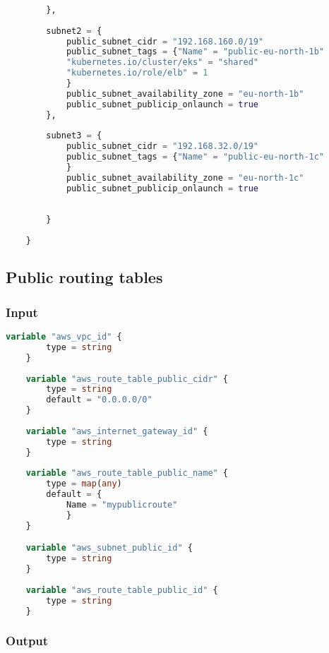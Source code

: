 \begin{lstlisting}[language=terraform]
            
        },
    
        subnet2 = {
            public_subnet_cidr = "192.168.160.0/19"
            public_subnet_tags = {"Name" = "public-eu-north-1b"
            "kubernetes.io/cluster/eks" = "shared"
            "kubernetes.io/role/elb" = 1
            }
            public_subnet_availability_zone = "eu-north-1b"
            public_subnet_publicip_onlaunch = true
        },
    
        subnet3 = {
            public_subnet_cidr = "192.168.32.0/19"
            public_subnet_tags = {"Name" = "public-eu-north-1c"
            }
            public_subnet_availability_zone = "eu-north-1c"
            public_subnet_publicip_onlaunch = true
    
    
        } 
    
    }   
\end{lstlisting}

\subsection{
{Public routing tables}}
\label{sec:Publieke route tabellen}

\subsubsection{
{Input}}
\label{sec:Input}

\begin{lstlisting}[language=terraform]
    variable "aws_vpc_id" {
        type = string
    }
    
    variable "aws_route_table_public_cidr" {
        type = string
        default = "0.0.0.0/0"
    }
    
    variable "aws_internet_gateway_id" {
        type = string
    }
    
    variable "aws_route_table_public_name" {
        type = map(any)
        default = {
            Name = "mypublicroute"
            }
    }

    variable "aws_subnet_public_id" {
        type = string
    }
    
    variable "aws_route_table_public_id" {
        type = string
    }    
\end{lstlisting}

\subsubsection{
{Output}}
\label{sec:Output}

